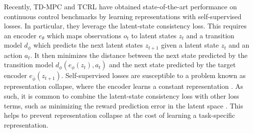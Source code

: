 \documentclass{article}
\theoremstyle{plain}
\theoremstyle{definition}
\theoremstyle{remark}
\begin{document}
Recently, TD-MPC \citep{hansenTemporalDifferenceLearning2022} and TCRL \citep{zhaoSimplifiedTemporalConsistency2023}
have obtained state-of-the-art performance on continuous control benchmarks by learning
representations with self-supervised losses.
In particular, they leverage the latent-state consistency loss.
This requires an encoder $e_{\theta}$ which maps observations $o_{t}$ to latent states $z_{t}$ and a transition model $d_{\phi}$ which predicts
the next latent states $z_{t+1}$ given a latent state $z_{t}$ and an action $a_{t}$.
It then minimizes the distance between the next state predicted by the transition model $d_{\phi}(e_{\phi}(z_{t}), a_{t})$
and the next state predicted by the target encoder $e_{\bar{\phi}}(z_{t+1})$.
Self-supervised losses are susceptible to a problem known as representation collapse, where the encoder learns a constant
representation \cite{jingUnderstandingDimensionalCollapse2021}.
As such, it is common to combine the latent-state consistency loss with other loss terms, such as
minimizing the reward prediction error in the latent space
\citep{zhangLearningInvariantRepresentations2020,zhaoSimplifiedTemporalConsistency2023,hansenTemporalDifferenceLearning2022,geladaDeepMDPLearningContinuous2019,rezaei-shoshtariContinuousMDPHomomorphisms2022}.
This helps to prevent representation collapse at the cost of learning a task-specific representation.

\end{document}
